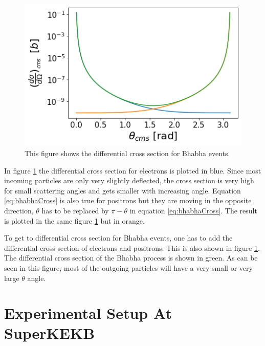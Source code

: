 \documentclass[a4paper,11pt,twosided,final,german,openbib,pdftex,listof=totoc,bibliography=totoc]{scrbook}
\begin{document}
\begin{figure}[h!]
	\centering
	\includegraphics[width=12cm]{Bilder/finalCross}
	\caption[Differential Cross Section For Bhabha Events]{This figure shows the differential cross section for Bhabha events.}
	\label{fig:CrossSectionBoth}
\end{figure}



In figure \ref{fig:CrossSectionBoth} the differential cross section for electrons is plotted in blue. Since most incoming particles are only very slightly deflected, the cross section is very high for small scattering angles and gets smaller with increasing angle. Equation \ref{eq:bhabhaCross} is also true for positrons but they are moving in the opposite direction, $\theta$ has to be replaced by $\pi - \theta$ in equation \ref{eq:bhabhaCross}. The result is plotted in the same figure \ref{fig:CrossSectionBoth} but in orange.






To get to differential cross section for Bhabha events, one has to add the differential cross section of electrons and positrons. This is also shown in figure \ref{fig:CrossSectionBoth}. The differential cross section of the Bhabha process is shown in green. As can be seen in this figure, most of the outgoing particles will have a very small or very large $\theta$ angle.





\chapter{Experimental Setup At SuperKEKB}
\label{sec:SetupKEK}
\end{document}
